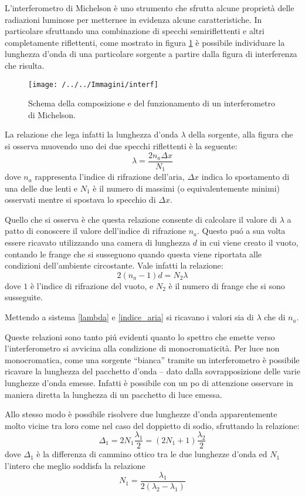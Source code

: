 \documentclass[a4paper,11pt]{article}
\newcommand{\virgolette}[1]{``#1''}
\begin{document}
L'interferometro di Michelson è uno strumento che sfrutta alcune proprietà delle radiazioni luminose per metternee in evidenza alcune caratteristiche. In particolare sfruttando una combinazione di specchi semiriflettenti e altri completamente riflettenti, come mostrato in figura \ref{interf} è possibile individuare la lunghezza d'onda di una particolare sorgente a partire dalla figura di interferenza che risulta.

\begin{figure}[htpb]
	\centering
	\texttt{[image: /../../Immagini/interf]}
	\caption{Schema della composizione e del funzionamento di un interferometro di Michelson.}\label{interf}
\end{figure}	

La relazione che lega infatti la lunghezza d'onda $\lambda$ della sorgente, alla figura che si osserva muovendo uno dei due specchi riflettenti è la seguente:
\begin{equation}\label{lambda}
\lambda=\dfrac{2n_a\Delta x}{N_1}
\end{equation}
dove $n_a$ rappresenta l'indice di rifrazione dell'aria, $\Delta x$ indica lo spostamento di una delle due lenti e $N_1$ è il numero di massimi (o equivalentemente minimi) osservati mentre si spostava lo specchio di $\Delta x$.

Quello che si osserva è che questa relazione consente di calcolare il valore di $\lambda$ a patto di conoscere il valore dell'indice di rifrazione $n_a$. Questo pu\'o a sua volta essere ricavato utilizzando una camera di lunghezza $d$ in cui viene creato il vuoto, contando le frange che si susseguono quando questa viene riportata alle condizioni dell'ambiente circostante. Vale infatti la relazione:
\begin{equation}\label{indice_aria}
	2 (n_a - 1) d = N_2 \lambda
\end{equation}
dove $1$ è l'indice di rifrazione del vuoto, e $N_2$ è il numero di frange che si sono susseguite.

Mettendo a sistema \ref{lambda} e \ref{indice_aria} si ricavano i valori sia di $\lambda$ che di $n_a$.

Queste relazioni sono tanto pi\'u evidenti quanto lo spettro che emette verso l'interferometro si avvicina alla condizione di monocromaticità. Per luce non monocromatica, come una sorgente \virgolette{bianca} tramite un interferometro è possibile ricavare la lunghezza del pacchetto d'onda -- dato dalla sovrapposizione delle varie lunghezze d'onda emesse. Infatti è possibile con un po di attenzione osservare in maniera diretta la lunghezza di un pacchetto di luce emessa.

Allo stesso modo è possibile risolvere due lunghezze d'onda apparentemente molto vicine tra loro come nel caso del doppietto di sodio, sfruttando la relazione:
\begin{equation}\label{delta1}
	\Delta_1=2N_1\frac{\lambda_1}{2}=(2N_1+1)\frac{\lambda_2}{2}
\end{equation}
dove $\Delta_1$ è la differenza di cammino ottico tra le due lunghezze d'onda ed $N_1$ l'intero che meglio soddisfa la relazione 
\[
N_1 = \dfrac{\lambda_1}{2(\lambda_2 - \lambda_1)}\]
\end{document}
